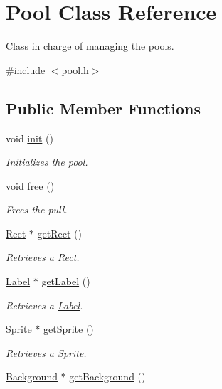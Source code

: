 \hypertarget{class_pool}{}\section{Pool Class Reference}
\label{class_pool}


Class in charge of managing the pools.  




{\ttfamily \#include $<$pool.\+h$>$}

\subsection*{Public Member Functions}
\begin{DoxyCompactItemize}
\item 
void \hyperlink{class_pool_a7b5bfb074b19ea0169edf7c2d73b2f6e}{init} ()
\begin{DoxyCompactList}\small\item\em Initializes the pool. \end{DoxyCompactList}\item 
void \hyperlink{class_pool_aa2bcc7b11c5f0a438b1fe5405ba698ff}{free} ()
\begin{DoxyCompactList}\small\item\em Frees the pull. \end{DoxyCompactList}\item 
\hyperlink{class_rect}{Rect} $\ast$ \hyperlink{class_pool_a2ea49e227ce14fcb926d451f9f59e452}{get\+Rect} ()
\begin{DoxyCompactList}\small\item\em Retrieves a \hyperlink{class_rect}{Rect}. \end{DoxyCompactList}\item 
\hyperlink{class_label}{Label} $\ast$ \hyperlink{class_pool_a13ce02d7dbee29305a83dcdb22a01661}{get\+Label} ()
\begin{DoxyCompactList}\small\item\em Retrieves a \hyperlink{class_label}{Label}. \end{DoxyCompactList}\item 
\hyperlink{class_sprite}{Sprite} $\ast$ \hyperlink{class_pool_abd15708186d45b2e45312c872dd84384}{get\+Sprite} ()
\begin{DoxyCompactList}\small\item\em Retrieves a \hyperlink{class_sprite}{Sprite}. \end{DoxyCompactList}\item 
\hyperlink{class_background}{Background} $\ast$ \hyperlink{class_pool_a367c875efe93a27fea4bcaf0ed281abd}{get\+Background} ()

\end{DoxyCompactItemize}
